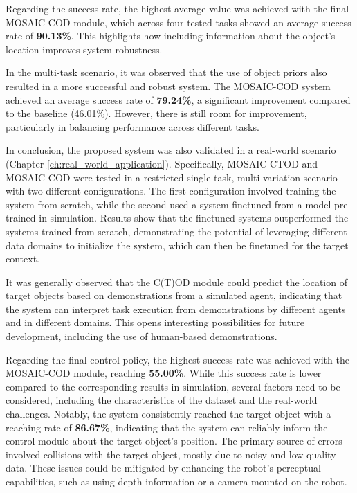 Regarding the success rate, the highest average value was achieved with the final MOSAIC-COD module, which across four tested tasks showed an average success rate of \textbf{90.13\%}. This highlights how including information about the object's location improves system robustness. 

In the multi-task scenario, it was observed that the use of object priors also resulted in a more successful and robust system. The MOSAIC-COD system achieved an average success rate of \textbf{79.24\%}, a significant improvement compared to the baseline (46.01\%). However, there is still room for improvement, particularly in balancing performance across different tasks.

In conclusion, the proposed system was also validated in a real-world scenario (Chapter \ref{ch:real_world_application}). Specifically, MOSAIC-CTOD and MOSAIC-COD were tested in a restricted single-task, multi-variation scenario with two different configurations. The first configuration involved training the system from scratch, while the second used a system finetuned from a model pre-trained in simulation. Results show that the finetuned systems outperformed the systems trained from scratch, demonstrating the potential of leveraging different data domains to initialize the system, which can then be finetuned for the target context.

It was generally observed that the C(T)OD module could predict the location of target objects based on demonstrations from a simulated agent, indicating that the system can interpret task execution from demonstrations by different agents and in different domains. This opens interesting possibilities for future development, including the use of human-based demonstrations.

Regarding the final control policy, the highest success rate was achieved with the MOSAIC-COD module, reaching \textbf{55.00\%}. While this success rate is lower compared to the corresponding results in simulation, several factors need to be considered, including the characteristics of the dataset and the real-world challenges. Notably, the system consistently reached the target object with a reaching rate of \textbf{86.67\%}, indicating that the system can reliably inform the control module about the target object's position. The primary source of errors involved collisions with the target object, mostly due to noisy and low-quality data. These issues could be mitigated by enhancing the robot's perceptual capabilities, such as using depth information or a camera mounted on the robot.
